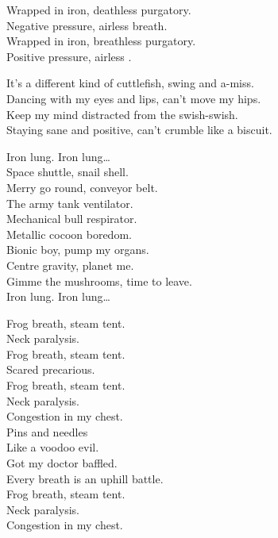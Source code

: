 Wrapped in iron, deathless purgatory. \\
Negative pressure, airless breath. \\
Wrapped in iron, breathless purgatory. \\
Positive pressure, airless . \\


It's a different kind of cuttlefish, swing and a-miss. \\
Dancing with my eyes and lips, can't move my hips. \\
Keep my mind distracted from the swish-swish. \\
Staying sane and positive, can't crumble like a biscuit. \\


Iron lung. Iron lung… \\

Space shuttle, snail shell. \\
Merry go round, conveyor belt. \\
The army tank ventilator. \\
Mechanical bull respirator. \\
Metallic cocoon boredom. \\
Bionic boy, pump my organs. \\
Centre gravity, planet me. \\
Gimme the mushrooms, time to leave. \\

Iron lung. Iron lung… \\


Frog breath, steam tent. \\
Neck paralysis. \\
Frog breath, steam tent. \\
Scared precarious. \\
Frog breath, steam tent. \\
Neck paralysis. \\
Congestion in my chest. \\

Pins and needles \\
Like a voodoo evil. \\
Got my doctor baffled. \\
Every breath is an uphill battle. \\
Frog breath, steam tent. \\
Neck paralysis. \\
Congestion in my chest. \\

